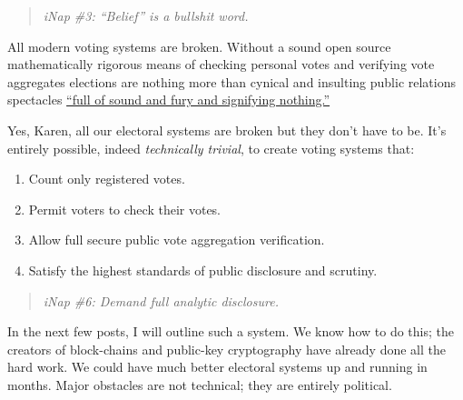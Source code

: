 \begin{quote}
\emph{iNap \#3: ``Belief'' is a bullshit word.}
\end{quote}

All modern voting systems are broken. Without a sound open source
mathematically rigorous means of checking personal votes and verifying
vote aggregates elections are nothing more than cynical and insulting
public relations spectacles
\href{https://www.poetryfoundation.org/poems/56964/speech-tomorrow-and-tomorrow-and-tomorrow}{``full
of sound and fury and signifying nothing.''}

Yes, Karen, all our electoral systems are broken but they don't have to
be. It's entirely possible, indeed \emph{technically trivial}, to create
voting systems that:

\begin{enumerate}
\def\labelenumi{\arabic{enumi}.}
\item
  Count only registered votes.
\item
  Permit voters to check their votes.
\item
  Allow full secure public vote aggregation verification.
\item
  Satisfy the highest standards of public disclosure and scrutiny.
\end{enumerate}

\begin{quote}
\emph{iNap \#6: Demand full analytic disclosure.}
\end{quote}

In the next few posts, I will outline such a system. We know how to do
this; the creators of block-chains and public-key cryptography have
already done all the hard work. We could have much better electoral
systems up and running in months. Major obstacles are not technical;
they are entirely political.



%
